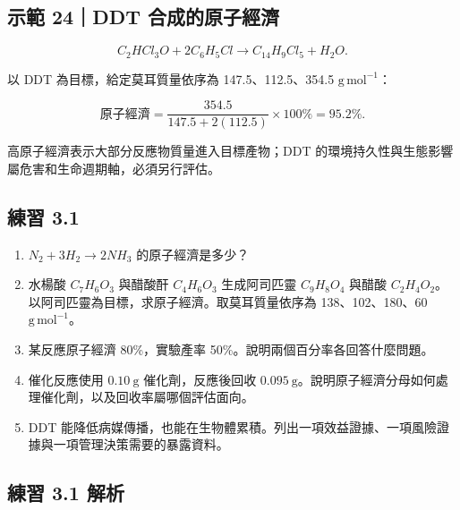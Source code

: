 \documentclass[11pt,a4paper]{article}
\providecommand{\tightlist}{%
  \setlength{\itemsep}{0pt}\setlength{\parskip}{0pt}}
\begin{document}
\begin{HandoutWorkedExample}

\subsection{示範 24｜DDT 合成的原子經濟}\label{ux793aux7bc4-24ddt-ux5408ux6210ux7684ux539fux5b50ux7d93ux6fdf}

\[
C_2HCl_3O+2C_6H_5Cl\rightarrow C_{14}H_9Cl_5+H_2O.
\]

以 DDT 為目標，給定莫耳質量依序為 147.5、112.5、354.5 \(\mathrm{g\,mol^{-1}}\)：

\[
\text{原子經濟}
=\frac{354.5}{147.5+2(112.5)}\times100\%
=95.2\%.
\]

高原子經濟表示大部分反應物質量進入目標產物；DDT 的環境持久性與生態影響屬危害和生命週期軸，必須另行評估。

\end{HandoutWorkedExample}

\subsection{練習 3.1}\label{ux7df4ux7fd2-3.1}

\begin{enumerate}
\def\labelenumi{\arabic{enumi}.}
\tightlist
\item
  \(N_2+3H_2\rightarrow2NH_3\) 的原子經濟是多少？
\item
  水楊酸 \(C_7H_6O_3\) 與醋酸酐 \(C_4H_6O_3\) 生成阿司匹靈 \(C_9H_8O_4\) 與醋酸 \(C_2H_4O_2\)。以阿司匹靈為目標，求原子經濟。取莫耳質量依序為 138、102、180、60 \(\mathrm{g\,mol^{-1}}\)。
\item
  某反應原子經濟 80\%，實驗產率 50\%。說明兩個百分率各回答什麼問題。
\item
  催化反應使用 \(0.10\ \mathrm g\) 催化劑，反應後回收 \(0.095\ \mathrm g\)。說明原子經濟分母如何處理催化劑，以及回收率屬哪個評估面向。
\item
  DDT 能降低病媒傳播，也能在生物體累積。列出一項效益證據、一項風險證據與一項管理決策需要的暴露資料。
\end{enumerate}

\subsection{練習 3.1 解析}\label{ux7df4ux7fd2-3.1-ux89e3ux6790}
\end{document}
